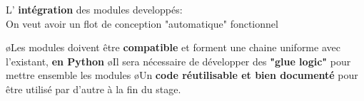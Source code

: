 %
\begin{frame} 
	L' \textbf{intégration} des modules developpés:\\
	On veut avoir un flot de conception "automatique" fonctionnel
	\begin{center}
	\end{center}
	\smallskip
    \BI
	\o Les modules doivent être \textbf{compatible} et forment une chaine uniforme avec l'existant,\textbf{ en Python}
    \o Il sera nécessaire de développer des \textbf{"glue logic"} pour mettre ensemble les modules 
	\o Un \textbf{code réutilisable et bien documenté} pour être utilisé par d'autre à la fin du stage.
    \EI
\end{frame}
